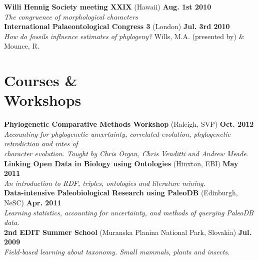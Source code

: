 \documentclass[margin,line]{resume}
\begin{document}
\begin{resume}
\vspace{-7 mm} 
\textbf{Willi Hennig Society meeting XXIX} (Hawaii)
 \hfill \textbf{Aug. 1st 2010}\\
    \textsl{The congruence of morphological characters}\\

\vspace{-7 mm} 
\textbf{International Palaeontological Congress 3} (London)
 \hfill \textbf{Jul. 3rd 2010}\\
    \textsl{How do fossils influence estimates of phylogeny?} Wills, M.A. (presented by) \& Mounce, R. \\

\vspace{-7 mm}

    \section{\mysidestyle Courses \& \\ Workshops} 
\textbf{Phylogenetic Comparative Methods Workshop} (Raleigh, SVP) \hfill \textbf{Oct. 2012}\\
    \textsl{Accounting for phylogenetic uncertainty, correlated evolution, phylogenetic retrodiction and rates of \\ character evolution. Taught by Chris Organ, Chris Venditti and Andrew Meade.}\\

\vspace{-7 mm} 
\textbf{Linking Open Data in Biology using Ontologies} (Hinxton, EBI)
 \hfill \textbf{May 2011}\\
    \textsl{An introduction to RDF, triples, ontologies and literature mining.}\\

\vspace{-7 mm} 
\textbf{Data-intensive Paleobiological Research using PaleoDB} (Edinburgh, NeSC)
 \hfill \textbf{Apr. 2011}\\
    \textsl{Learning statistics, accounting for uncertainty, and methods of querying PaleoDB data.}\\

\vspace{-7 mm} 
\textbf{2nd EDIT Summer School} (Muranska Planina National Park, Slovakia)
 \hfill \textbf{Jul. 2009}\\
    \textsl{Field-based learning about taxonomy. Small mammals, plants and insects.}\\


\end{resume}
\end{document}
